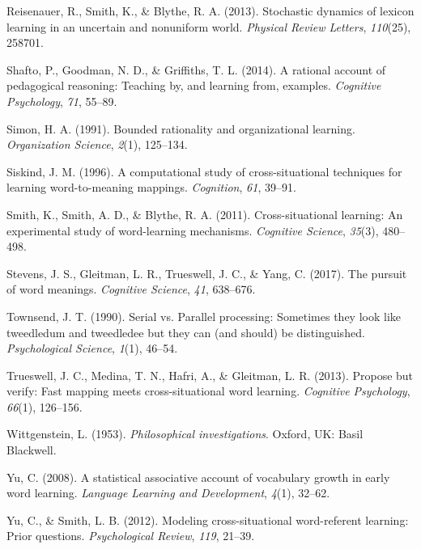 \documentclass[english,,man,floatsintext]{apa6}
\begin{document}
\leavevmode\hypertarget{ref-reisenauer2013}{}%
Reisenauer, R., Smith, K., \& Blythe, R. A. (2013). Stochastic dynamics of lexicon learning in an uncertain and nonuniform world. \emph{Physical Review Letters}, \emph{110}(25), 258701.

\leavevmode\hypertarget{ref-shafto2014}{}%
Shafto, P., Goodman, N. D., \& Griffiths, T. L. (2014). A rational account of pedagogical reasoning: Teaching by, and learning from, examples. \emph{Cognitive Psychology}, \emph{71}, 55--89.

\leavevmode\hypertarget{ref-simon1991}{}%
Simon, H. A. (1991). Bounded rationality and organizational learning. \emph{Organization Science}, \emph{2}(1), 125--134.

\leavevmode\hypertarget{ref-siskind1996}{}%
Siskind, J. M. (1996). A computational study of cross-situational techniques for learning word-to-meaning mappings. \emph{Cognition}, \emph{61}, 39--91.

\leavevmode\hypertarget{ref-smith2011}{}%
Smith, K., Smith, A. D., \& Blythe, R. A. (2011). Cross-situational learning: An experimental study of word-learning mechanisms. \emph{Cognitive Science}, \emph{35}(3), 480--498.

\leavevmode\hypertarget{ref-stevens2017}{}%
Stevens, J. S., Gleitman, L. R., Trueswell, J. C., \& Yang, C. (2017). The pursuit of word meanings. \emph{Cognitive Science}, \emph{41}, 638--676.

\leavevmode\hypertarget{ref-townsend1990}{}%
Townsend, J. T. (1990). Serial vs. Parallel processing: Sometimes they look like tweedledum and tweedledee but they can (and should) be distinguished. \emph{Psychological Science}, \emph{1}(1), 46--54.

\leavevmode\hypertarget{ref-trueswell2013}{}%
Trueswell, J. C., Medina, T. N., Hafri, A., \& Gleitman, L. R. (2013). Propose but verify: Fast mapping meets cross-situational word learning. \emph{Cognitive Psychology}, \emph{66}(1), 126--156.

\leavevmode\hypertarget{ref-wittgenstein1953}{}%
Wittgenstein, L. (1953). \emph{Philosophical investigations}. Oxford, UK: Basil Blackwell.

\leavevmode\hypertarget{ref-yu2008}{}%
Yu, C. (2008). A statistical associative account of vocabulary growth in early word learning. \emph{Language Learning and Development}, \emph{4}(1), 32--62.

\leavevmode\hypertarget{ref-yu2012}{}%
Yu, C., \& Smith, L. B. (2012). Modeling cross-situational word-referent learning: Prior questions. \emph{Psychological Review}, \emph{119}, 21--39.
\end{document}

